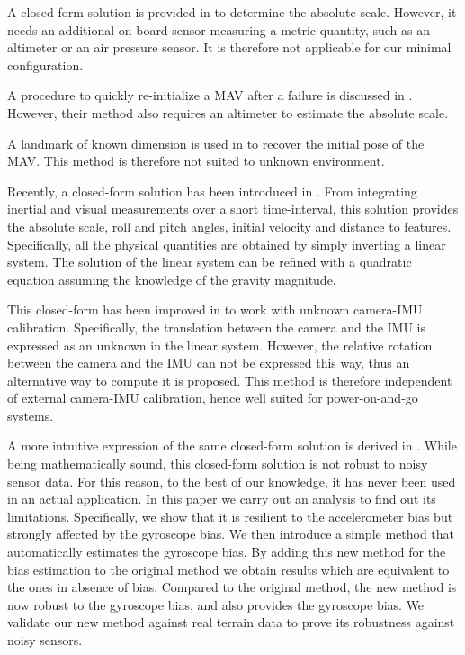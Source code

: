 \documentclass[letterpaper, 10 pt, conference]{ieeeconf}  %
\begin{document}


A closed-form solution is provided in \cite{Engel2013} to determine the absolute scale.
However, it needs an additional on-board sensor measuring a metric quantity, such as an altimeter or an air pressure sensor.
It is therefore not applicable for our minimal configuration.

A procedure to quickly re-initialize a MAV after a failure is discussed in \cite{Faessler2015}.
However, their method also requires an altimeter to estimate the absolute scale.

A landmark of known dimension is used in \cite{Gemeiner2007} to recover the initial pose of the MAV.
This method is therefore not suited to unknown environment.

Recently, a closed-form solution has been introduced in \cite{Martinelli2012}.
From integrating inertial and visual measurements over a short time-interval, this solution provides the absolute scale, roll and pitch angles, initial velocity and distance to features.
Specifically, all the physical quantities are obtained by simply inverting a linear system.
The solution of the linear system can be refined with a quadratic equation assuming the knowledge of the gravity magnitude.

This closed-form has been improved in \cite{Li2013} to work with unknown camera-IMU calibration.
Specifically, the translation between the camera and the IMU is expressed as an unknown in the linear system.
However, the relative rotation between the camera and the IMU can not be expressed this way,
thus an alternative way to compute it is proposed.
This method is therefore independent of external camera-IMU calibration, hence well suited for power-on-and-go systems.

A more intuitive expression of the same closed-form solution is derived in \cite{Martinelli2014}.
While being mathematically sound, this closed-form solution is not robust to noisy sensor data.
For this reason, to the best of our knowledge, it has never been used in an actual application.
In this paper we carry out an analysis to find out its limitations.
Specifically, we show that it is resilient to the accelerometer bias but strongly affected by the gyroscope bias.
We then introduce a simple method that automatically estimates the gyroscope bias.
By adding this new method for the bias estimation to the original method we obtain results which are equivalent to the ones in absence of bias.
Compared to the original method, the new method is now robust to the gyroscope bias, and also provides the gyroscope bias.
We validate our new method against real terrain data to prove its robustness against noisy sensors.
\end{document}
